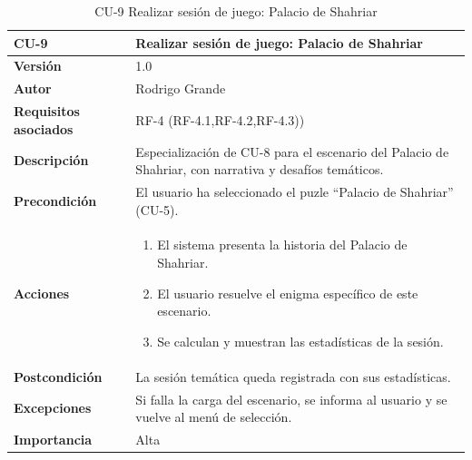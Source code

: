\begin{table}[p]
	\centering
	\begin{tabularx}{\linewidth}{ p{} p{} }
		\toprule
		\textbf{CU-9} & \textbf{Realizar sesión de juego: Palacio de Shahriar}\\
		\toprule
		\textbf{Versión}              & 1.0    \\
		\textbf{Autor}                & Rodrigo Grande \\
		\textbf{Requisitos asociados} & RF-4 (RF-4.1,RF-4.2,RF-4.3)) \\
		\textbf{Descripción}          & Especialización de CU-8 para el escenario del Palacio de Shahriar, con narrativa y desafíos temáticos.\\
		\textbf{Precondición}         & El usuario ha seleccionado el puzle “Palacio de Shahriar” (CU-5). \\
		\textbf{Acciones}             &
		\begin{enumerate}
			\def\labelenumi{\arabic{enumi}.}
			\tightlist
			\item El sistema presenta la historia del Palacio de Shahriar.
			\item El usuario resuelve el enigma específico de este escenario.
			\item Se calculan y muestran las estadísticas de la sesión.
		\end{enumerate}\\
		\textbf{Postcondición}        & La sesión temática queda registrada con sus estadísticas. \\
		\textbf{Excepciones}          & Si falla la carga del escenario, se informa al usuario y se vuelve al menú de selección. \\
		\textbf{Importancia}          & Alta \\
		\bottomrule
	\end{tabularx}
	\caption{CU-9 Realizar sesión de juego: Palacio de Shahriar }
	\label{cu:realizar-sesion-palacio-shahriar}
    \end{table}
